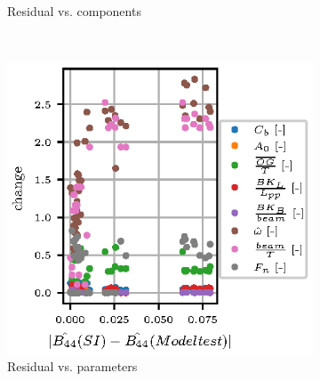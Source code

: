\begin{figure}
\begin{subfigure}[b]{0.485\textwidth}
        \caption{Residual vs. components}
        \label{fig:component_residual}
    \end{subfigure}
    \newline
    ~ %
    \begin{subfigure}[b]{0.485\textwidth}
        \centering
        \includegraphics[width=\textwidth]{figures/parameter_residual.eps}
        \caption{Residual vs. parameters}
        \label{fig:parameter_residual}
    \end{subfigure}
    ~ %
    \begin{subfigure}[b]{0.485\textwidth}
        \centering

\end{subfigure}
\end{figure}
